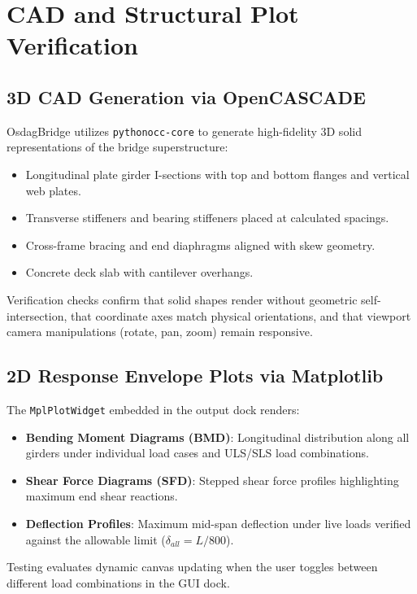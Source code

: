 \chapter{CAD and Structural Plot Verification}
\label{chap:cad_plot_verification}

\section{3D CAD Generation via OpenCASCADE}
OsdagBridge utilizes \texttt{pythonocc-core} to generate high-fidelity 3D solid representations of the bridge superstructure:
\begin{itemize}
    \item Longitudinal plate girder I-sections with top and bottom flanges and vertical web plates.
    \item Transverse stiffeners and bearing stiffeners placed at calculated spacings.
    \item Cross-frame bracing and end diaphragms aligned with skew geometry.
    \item Concrete deck slab with cantilever overhangs.
\end{itemize}

Verification checks confirm that solid shapes render without geometric self-intersection, that coordinate axes match physical orientations, and that viewport camera manipulations (rotate, pan, zoom) remain responsive.

\section{2D Response Envelope Plots via Matplotlib}
The \texttt{MplPlotWidget} embedded in the output dock renders:
\begin{itemize}
    \item \textbf{Bending Moment Diagrams (BMD)}: Longitudinal distribution along all girders under individual load cases and ULS/SLS load combinations.
    \item \textbf{Shear Force Diagrams (SFD)}: Stepped shear force profiles highlighting maximum end shear reactions.
    \item \textbf{Deflection Profiles}: Maximum mid-span deflection under live loads verified against the allowable limit ($\delta_{all} = L / 800$).
\end{itemize}

Testing evaluates dynamic canvas updating when the user toggles between different load combinations in the GUI dock.
